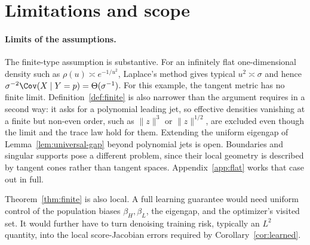 \documentclass[10pt]{article}
\theoremstyle{c2fup}
\begin{document}
\FloatBarrier

\section{Limitations and scope}
\label{sec:roadmap}

\paragraph{Limits of the assumptions.}
The finite-type assumption is substantive.  For an infinitely flat one-dimensional density such as $\rho(u)\asymp e^{-1/u^2}$, Laplace's method gives typical $u^2\asymp\sigma$ and hence $\sigma^{-2}\Cov(X\mid Y=p)=\Theta(\sigma^{-1})$.  For this example, the tangent metric has no finite limit.  Definition~\ref{def:finite} is also narrower than the argument requires in a second way: it asks for a polynomial leading jet, so effective densities vanishing at a finite but non-even order, such as $\|z\|^{3}$ or $\|z\|^{1/2}$, are excluded even though the limit and the trace law hold for them.  Extending the uniform eigengap of Lemma~\ref{lem:universal-gap} beyond polynomial jets is open.  Boundaries and singular supports pose a different problem, since their local geometry is described by tangent cones rather than tangent spaces.  Appendix~\ref{app:flat} works that case out in full.

Theorem~\ref{thm:finite} is also local.  A full learning guarantee would need uniform control of the population biases $\beta_H,\beta_L$, the eigengap, and the optimizer's visited set.  It would further have to turn denoising training risk, typically an $L^2$ quantity, into the local score-Jacobian errors required by Corollary~\ref{cor:learned}.
\end{document}
